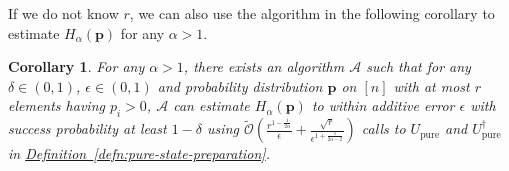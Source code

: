 \documentclass[journal]{IEEEtran}
\newtheorem{corollary}{Corollary}
\newcommand{\defn}[1]{\hyperref[defn:#1]{Definition~\ref*{defn:#1}}}
\begin{document}
If we do not know $r$, we can also use the algorithm in the following corollary to estimate $H_{\alpha}(\mathbf{p})$ for any $\alpha > 1$.

\begin{corollary}
\label{cor:large-alpha-not-r}
  For any $\alpha > 1$, there exists an algorithm $\mathcal{A}$ such that for any $\delta \in (0,1)$, $\epsilon\in(0,1)$ and probability distribution $\mathbf{p}$ on $[n]$ with at most $r$ elements having $p_i>0$, $\mathcal{A}$ can estimate $H_{\alpha}(\mathbf{p})$ to within additive error $\epsilon$
  with success probability at least $1-\delta$ using $\widetilde{\mathcal{O}}\left(\frac{r^{1-\frac{1}{2\alpha}}}{\epsilon} + \frac{\sqrt{r}}{\epsilon^{1+\frac{1}{2\alpha-2}}}\right)$ calls to $U_{\mathrm{pure}}$ and $U_{\mathrm{pure}}^{\dagger}$ in \defn{pure-state-preparation}.
\end{corollary}
\end{document}
